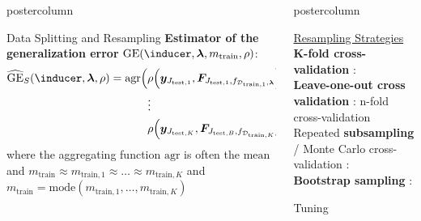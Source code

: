 \documentclass{beamer}
\newlength{\columnheight} %
\begin{document}
\begin{frame}[fragile]{}
\begin{columns}
\begin{column}{.31\textwidth}
\begin{beamercolorbox}[center]{postercolumn}
\begin{minipage}{.98\textwidth}
{\begin{myblock}{Data Splitting and Resampling}
\textbf{Estimator of the generalization error} $\mathrm{GE}(\inducer, \bm{\lambda}, m_\mathrm{train}, \rho)$:
\begin{equation*}
\begin{split}
\widehat{\mathrm{GE}}_S(\inducer, \boldsymbol\lambda, \rho) = \mathrm{agr}\Big(
 &\rho\Big(\boldsymbol{y}_{J_{\mathrm{test},1}}, \boldsymbol{F}_{J_{\mathrm{test},1},f_{\mathcal{D}_{\mathrm{train},1}, \boldsymbol\lambda}}\Big), \\ &\large{\vdots} \\
& \rho\Big(\boldsymbol{y}_{J_{\mathrm{test},K}}, \boldsymbol{F}_{J_{\mathrm{test},B},
f_{\mathcal{D}_{\mathrm{train},K}, \boldsymbol\lambda}}\Big)
    \Big),
\end{split}
\end{equation*}
where the aggregating function $\mathrm{agr}$ is often the $\textrm{mean}$ and
$m_{\mathrm{train}} \approx m_{\mathrm{train},1} \approx \dots \approx m_{\mathrm{train},K}$ and $m_{\mathrm{train}} = \mathrm{mode}(m_{\mathrm{train},1}, \dots, m_{\mathrm{train},K})$
\end{myblock}
\vfill
				}
			\end{minipage}
		\end{beamercolorbox}
	\end{column}
	\begin{column}{.31\textwidth}
		\begin{beamercolorbox}[center]{postercolumn}
			\begin{minipage}{.98\textwidth}
				\parbox[t][\columnheight]{\textwidth}{
\underline{Resampling Strategies}\\

\textbf{K-fold cross-validation} :\\ 

\textbf{Leave-one-out cross validation}  : n-fold cross-validation\\

Repeated \textbf{subsampling} / Monte Carlo cross-validation :\\ 

\textbf{Bootstrap sampling} : \\ 

\begin{myblock}{Tuning}


\end{myblock}}
\end{minipage}
\end{beamercolorbox}
\end{column}
\end{columns}
\end{frame}
\end{document}
